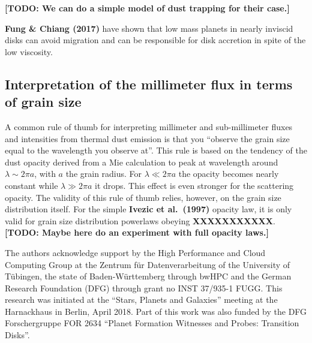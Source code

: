 \documentclass{aa}
\begin{document}
{\bf [TODO: We can do a simple model of dust trapping for their case.]}

{\bf Fung \& Chiang (2017)} have shown that low mass planets in nearly inviscid
disks can avoid migration and can be responsible for disk accretion in spite
of the low viscosity.

\subsection{Interpretation of the millimeter flux in terms of grain size}
A common rule of thumb for interpreting millimeter and sub-millimeter
fluxes and intensities from thermal dust emission is that you ``observe
the grain size equal to the wavelength you observe at''. This rule is
based on the tendency of the dust opacity derived from a Mie calculation
to peak at wavelength around $\lambda\sim 2\pi a$, with $a$ the grain
radius. For $\lambda \ll 2\pi a$ the opacity becomes nearly constant
while $\lambda \gg 2\pi a$ it drops. This effect is even stronger for
the scattering opacity. The validity of this rule of thumb relies,
however, on the grain size distribution itself. For the simple
{\bf Ivezic et al.~(1997)} opacity law, it is only valid for
grain size distribution powerlaws obeying {\bf XXXXXXXXXXX}.
{\bf [TODO: Maybe here do an experiment with full opacity laws.]}




\begin{acknowledgements}
  The authors acknowledge support
  by the High Performance and Cloud Computing Group at the Zentrum f\"ur
  Datenverarbeitung of the University of T\"ubingen, the state of
  Baden-W\"urttemberg through bwHPC and the German Research Foundation (DFG)
  through grant no INST 37/935-1 FUGG. This research was initiated at the
  ``Stars, Planets and Galaxies'' meeting at the Harnackhaus in Berlin,
  April 2018. Part of this work was also funded by the DFG Forschergruppe
  FOR 2634 ``Planet Formation Witnesses and Probes: Transition Disks''.
\end{acknowledgements}


\begingroup


\endgroup
\end{document}

